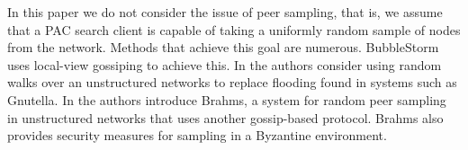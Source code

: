     In this paper we do not consider the issue of peer sampling, that is, we assume that a PAC search client is capable of taking a uniformly random sample of nodes from the network. Methods that achieve this goal are numerous. BubbleStorm uses local-view gossiping to achieve this. In \cite{Chawathe2003} the authors consider using random walks over an unstructured networks to replace flooding found in systems such as Gnutella. In \cite{bortnikov_brahms:_2009} the authors introduce Brahms, a system for random peer sampling in unstructured networks that uses another gossip-based protocol. Brahms also provides security measures for sampling in a Byzantine environment.
